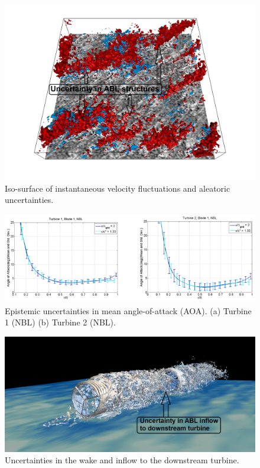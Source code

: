 \documentclass[]{aiaa-tc}%
\begin{document}
\begin{figure}
 \includegraphics[scale=0.25]{UQ1.png}
 \caption{Iso-surface of instantaneous velocity fluctuations and aleatoric uncertainties.}
 \label{f:UQ1}
\end{figure}

\begin{figure}
 \includegraphics[scale=0.25]{ALM_discrepancy.png}
 \caption{Epistemic uncertainties in mean angle-of-attack (AOA). (a) Turbine 1 (NBL)    (b) Turbine 2 (NBL).}
 \label{f:ALM_discrepancy}
\end{figure}

\begin{figure}
 \includegraphics[scale=0.25]{UQ3.png}
 \caption{Uncertainties in the wake and inflow to the downstream turbine.}
 \label{f:UQ3}
\end{figure}
\end{document}
